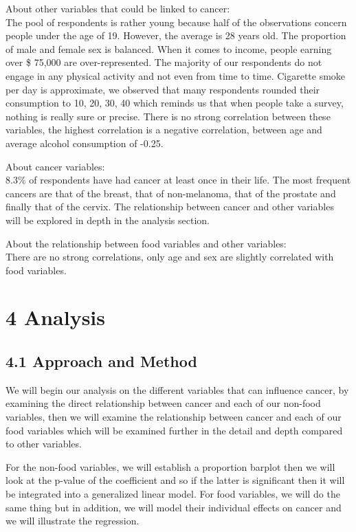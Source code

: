 \documentclass[
]{article}
\begin{document}
About other variables that could be linked to cancer:\\
The pool of respondents is rather young because half of the observations
concern people under the age of 19. However, the average is 28 years
old. The proportion of male and female sex is balanced. When it comes to
income, people earning over \$ 75,000 are over-represented. The majority
of our respondents do not engage in any physical activity and not even
from time to time. Cigarette smoke per day is approximate, we observed
that many respondents rounded their consumption to 10, 20, 30, 40 which
reminds us that when people take a survey, nothing is really sure or
precise. There is no strong correlation between these variables, the
highest correlation is a negative correlation, between age and average
alcohol consumption of -0.25.

About cancer variables:\\
8.3\% of respondents have had cancer at least once in their life. The
most frequent cancers are that of the breast, that of non-melanoma, that
of the prostate and finally that of the cervix. The relationship between
cancer and other variables will be explored in depth in the analysis
section.

About the relationship between food variables and other variables:\\
There are no strong correlations, only age and sex are slightly
correlated with food variables.

\hypertarget{analysis}{%
\section{4 Analysis}\label{analysis}}

\hypertarget{approach-and-method}{%
\subsection{4.1 Approach and Method}\label{approach-and-method}}

We will begin our analysis on the different variables that can influence
cancer, by examining the direct relationship between cancer and each of
our non-food variables, then we will examine the relationship between
cancer and each of our food variables which will be examined further in
the detail and depth compared to other variables.

For the non-food variables, we will establish a proportion barplot then
we will look at the p-value of the coefficient and so if the latter is
significant then it will be integrated into a generalized linear model.
For food variables, we will do the same thing but in addition, we will
model their individual effects on cancer and we will illustrate the
regression.
\end{document}
